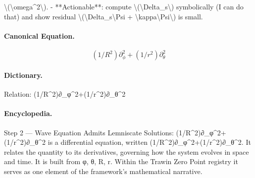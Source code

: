 \textbackslash{}(\textbackslash{}omega\textasciicircum{}2\textbackslash{}). - **Actionable**: compute \textbackslash{}(\textbackslash{}Delta\_s\textbackslash{}) symbolically (I can do that) and show residual \textbackslash{}(\textbackslash{}Delta\_s\textbackslash{}Psi + \textbackslash{}kappa\textbackslash{}Psi\textbackslash{}) is small.

\paragraph{Canonical Equation.}
\[
(1/R^2)\partial_\phi^2+(1/r^2)\partial_\theta^2
\]

\paragraph{Dictionary.}
Relation: (1/R\textasciicircum{}2)∂\_φ\textasciicircum{}2+(1/r\textasciicircum{}2)∂\_θ\textasciicircum{}2

\paragraph{Encyclopedia.}
Step 2 — Wave Equation Admits Lemniscate Solutions: (1/R\textasciicircum{}2)∂\_φ\textasciicircum{}2+(1/r\textasciicircum{}2)∂\_θ\textasciicircum{}2 is a differential equation, written (1/R\textasciicircum{}2)∂\_φ\textasciicircum{}2+(1/r\textasciicircum{}2)∂\_θ\textasciicircum{}2. It relates the quantity to its derivatives, governing how the system evolves in space and time. It is built from φ, θ, R, r. Within the Trawin Zero Point registry it serves as one element of the framework's mathematical narrative.
